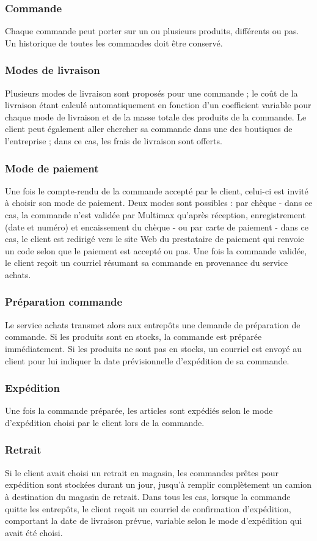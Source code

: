 \documentclass[a4paper,12pt]{article}
\begin{document}
\subsubsection*{Commande}
Chaque commande peut porter sur un ou plusieurs produits, différents ou pas.
Un historique de toutes les commandes doit être conservé.
\subsubsection*{Modes de livraison}
Plusieurs modes de livraison sont proposés pour une commande ;
le coût de la livraison étant calculé automatiquement en fonction d'un coefficient variable pour chaque mode de livraison et de la masse totale des produits de la commande.
Le client peut également aller chercher sa commande dans une des boutiques de l'entreprise ;
dans ce cas, les frais de livraison sont offerts.
\subsubsection*{Mode de paiement}
Une fois le compte-rendu de la commande accepté par le client, celui-ci est invité à choisir son mode de paiement. Deux modes sont possibles : par chèque - dans ce cas, la commande n'est validée par Multimax qu'après réception, enregistrement (date et numéro) et encaissement du chèque - ou par carte de paiement - dans ce cas, le client est redirigé vers le site Web du prestataire de paiement qui renvoie un code selon que le paiement est accepté ou pas.
Une fois la commande validée, le client reçoit un courriel résumant sa commande en provenance du service achats.
\subsubsection*{Préparation commande}
Le service achats transmet alors aux entrepôts une demande de préparation de commande. Si les produits sont en stocks, la commande est préparée immédiatement. Si les produits ne sont pas en stocks, un courriel est envoyé au client pour lui indiquer la date prévisionnelle d'expédition de sa commande.
\subsubsection*{Expédition}
Une fois la commande préparée, les articles sont expédiés selon le mode d'expédition choisi par le client lors de la commande.
\subsubsection*{Retrait}
Si le client avait choisi un retrait en magasin, les commandes prêtes pour expédition sont stockées durant un jour, jusqu'à remplir complètement un camion à destination du magasin de retrait.
Dans tous les cas, lorsque la commande quitte les entrepôts, le client reçoit un courriel de confirmation d'expédition, comportant la date de livraison prévue, variable selon le mode d'expédition qui avait été choisi.
\end{document}
